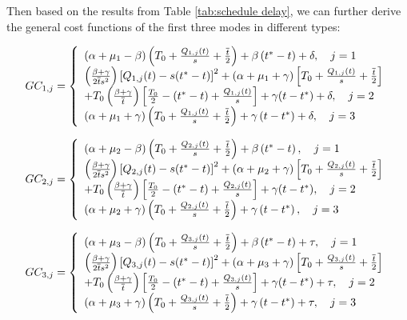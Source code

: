 \documentclass[a4paper,11pt]{article}
\begin{document}
Then based on the results from Table \ref{tab:schedule delay}, we can further derive the general cost functions of the first three modes in different types:

\begin{equation}
    GC_{1,j}=\left\{ 
    \begin{array}{l}
\left(\alpha+\mu_1-\beta \right)\left(T_0+\frac{Q_{1,j}(t)}{s}+\frac{\overline{t}}{2} \right)+\beta \left(t^*-t \right)+\delta, \quad j=1 \\
\left(\frac{\beta+\gamma}{2\overline{t}s^2} \right)\left[Q_{1,j}(t)-s(t^*-t) \right]^2+\left(\alpha+\mu_1+\gamma \right)\left[T_0+\frac{Q_{1,j}(t)}{s}+\frac{\overline{t}}{2} \right] \cr
+T_0\left(\frac{\beta+\gamma}{\overline{t}} \right)\left[\frac{T_0}{2}-(t^*-t)+\frac{Q_{1,j}(t)}{s} \right]+\gamma(t-t^*)+\delta, \quad j=2 \\
\left(\alpha+\mu_1+\gamma \right)\left(T_0+\frac{Q_{1,j}(t)}{s}+\frac{\overline{t}}{2} \right)+\gamma \left(t-t^* \right)+\delta, \quad j=3 \\
\end{array} 
    \right. \label{GC1}
\end{equation}

\begin{equation}
    GC_{2,j}=\left\{ 
    \begin{array}{l}
\left(\alpha+\mu_2-\beta \right)\left(T_0+\frac{Q_{2,j}(t)}{s}+\frac{\overline{t}}{2} \right)+\beta \left(t^*-t \right), \quad j=1 \\
\left(\frac{\beta+\gamma}{2\overline{t}s^2} \right)\left[Q_{2,j}(t)-s(t^*-t) \right]^2+\left(\alpha+\mu_2+\gamma \right)\left[T_0+\frac{Q_{2,j}(t)}{s}+\frac{\overline{t}}{2} \right] \cr
+T_0\left(\frac{\beta+\gamma}{\overline{t}} \right)\left[\frac{T_0}{2}-(t^*-t)+\frac{Q_{2,j}(t)}{s} \right]+\gamma(t-t^*), \quad j=2 \\
\left(\alpha+\mu_2+\gamma \right)\left(T_0+\frac{Q_{2,j}(t)}{s}+\frac{\overline{t}}{2} \right)+\gamma \left(t-t^* \right), \quad j=3 \\
\end{array} 
    \right. \label{GC2}
\end{equation}

\begin{equation}
    GC_{3,j}=\left\{ 
    \begin{array}{l}
\left(\alpha+\mu_3-\beta \right)\left(T_0+\frac{Q_{3,j}(t)}{s}+\frac{\overline{t}}{2} \right)+\beta \left(t^*-t \right)+\tau, \quad j=1 \\
\left(\frac{\beta+\gamma}{2\overline{t}s^2} \right)\left[Q_{3,j}(t)-s(t^*-t) \right]^2+\left(\alpha+\mu_3+\gamma \right)\left[T_0+\frac{Q_{3,j}(t)}{s}+\frac{\overline{t}}{2} \right] \cr
+T_0\left(\frac{\beta+\gamma}{\overline{t}} \right)\left[\frac{T_0}{2}-(t^*-t)+\frac{Q_{3,j}(t)}{s} \right]+\gamma(t-t^*)+\tau, \quad j=2 \\
\left(\alpha+\mu_3+\gamma \right)\left(T_0+\frac{Q_{3,j}(t)}{s}+\frac{\overline{t}}{2} \right)+\gamma \left(t-t^* \right)+\tau, \quad j=3 \\
\end{array} 
    \right. \label{GC3}
\end{equation}
\end{document}
